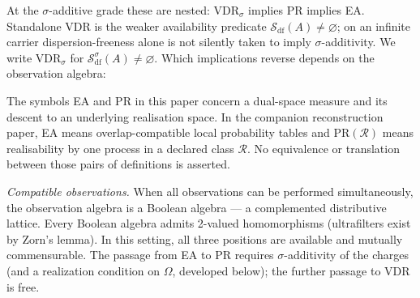 \noindent At the $\sigma$-additive grade these are nested:
$\mathrm{VDR}_\sigma$ implies PR implies EA.  Standalone VDR is the weaker
availability predicate $\mathcal{S}_{\mathrm{df}}(A)\ne\varnothing$; on an
infinite carrier dispersion-freeness alone is not silently taken to imply
$\sigma$-additivity.  We write $\mathrm{VDR}_\sigma$ for
$\mathcal{S}_{\mathrm{df}}^\sigma(A)\ne\varnothing$. Which implications
reverse depends on the observation algebra:

\begin{remark}
The symbols EA and PR in this paper concern a dual-space measure and its
descent to an underlying realisation space.  In the companion reconstruction
paper, EA means overlap-compatible local probability tables and
$\mathrm{PR}(\mathcal R)$ means realisability by one process in a declared
class $\mathcal R$.  No equivalence or translation between those pairs of
definitions is asserted.
\end{remark}

\smallskip
\noindent\emph{Compatible observations.}
When all observations can be performed simultaneously, the
observation algebra is a Boolean algebra --- a complemented
distributive lattice.  Every Boolean algebra admits 2-valued
homomorphisms (ultrafilters exist by Zorn's lemma).  In this
setting, all three positions are available and mutually
commensurable.  The passage from EA to PR requires
$\sigma$-additivity of the charges (and a realization condition on
$\Omega$, developed below); the further passage to VDR is free.

